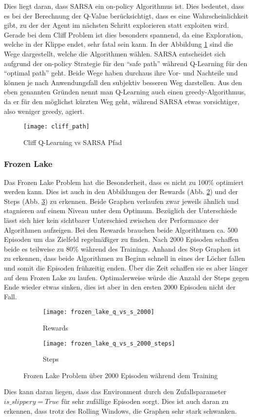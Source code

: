 Dies liegt daran, dass SARSA ein on-policy Algorithmus ist. Dies bedeutet, dass es bei der Berechnung der Q-Value berücksichtigt, dass es eine Wahrscheinlichkeit gibt, zu der der Agent im nächsten Schritt explorieren statt exploiten wird.
Gerade bei dem Cliff Problem ist dies besonders spannend, da eine Exploration, welche in der Klippe endet, sehr fatal sein kann. In der Abbildung \ref{fig:cliff_path} sind die Wege dargestellt, welche die Algorithmen wählen. SARSA entscheidet sich aufgrund der on-policy Strategie für den ``safe path'' während Q-Learning für den ``optimal path'' geht. 
Beide Wege haben durchaus ihre Vor- und Nachteile und können je nach Anwendungsfall den subjektiv besseren Weg darstellen.
Aus den eben genannten Gründen nennt man Q-Learning auch einen greedy-Algorithmus, da er für den möglichst kürzten Weg geht, während SARSA etwas vorsichtiger, also weniger greedy, agiert.

\begin{figure}[H]
    \texttt{[image: cliff\_path]}
    \caption{Cliff Q-Learning vs SARSA Pfad}
    \label{fig:cliff_path}
\end{figure}

\subsubsection{Frozen Lake}

Das Frozen Lake Problem hat die Besonderheit, dass es nicht zu 100\% optimiert werden kann. Dies ist auch in den Abbildungen der Rewards (Abb. \ref{fig:frozen_rew}) und der Steps (Abb. \ref{fig:frozen_step}) zu erkennen. Beide Graphen verlaufen zwar jeweils ähnlich und stagnieren auf einem Niveau unter dem Optimum. Bezüglich der Unterschiede lässt sich hier kein sichtbarer Unterschied zwischen der Performance der Algorithmen aufzeigen. Bei den Rewards brauchen beide Algorithtmen ca. 500 Episoden um das Zielfeld regelmäßiger zu finden. Nach 2000 Episoden schaffen beide es teilweise zu 80\% während des Trainings. 
Anhand des Step Graphen ist zu erkennen, dass beide Algorithmen zu Beginn schnell in eines der Löcher fallen und somit die Episoden frühzeitig enden. Über die Zeit schaffen sie es aber länger auf dem Frozen Lake zu laufen. Optimalerweise würde die Anzahl der Steps gegen Ende wieder etwas sinken, dies ist aber in den ersten 2000 Episoden nicht der Fall.


\begin{figure}[H]
    \centering
    \begin{subfigure}{.5\textwidth}
      \centering
      \texttt{[image: frozen\_lake\_q\_vs\_s\_2000]}
      \caption{Rewards}
      \label{fig:frozen_rew}
    \end{subfigure}%
    \begin{subfigure}{.5\textwidth}
      \centering
      \texttt{[image: frozen\_lake\_q\_vs\_s\_2000\_steps]}
      \caption{Steps}
      \label{fig:frozen_step}
    \end{subfigure}
    \caption{Frozen Lake Problem über 2000 Episoden während dem Training}
    \label{fig:frozen_train}
\end{figure}

Dies kann daran liegen, dass das Environment durch den Zufallsparameter $is\_slippery = True$ für sehr zufällige Episoden sorgt. Dies ist auch daran zu erkennen, dass trotz des Rolling Windows, die Graphen sehr stark schwanken.

